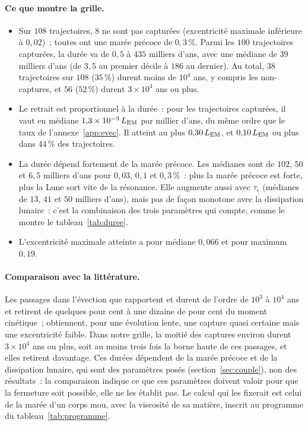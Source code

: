 \documentclass[11pt,a4paper]{article}
\newcommand{\LEM}{\ensuremath{L_{\rm EM}}}
\begin{document}
\paragraph{Ce que montre la grille.}
\begin{itemize}
\item Sur $108$ trajectoires, $8$ ne sont pas capturées (excentricité maximale inférieure à $0{,}02$)~; toutes ont une marée précoce de $0{,}3\,\%$. Parmi les $100$ trajectoires capturées, la durée va de $0{,}5$ à $435$ milliers d'ans, avec une médiane de $39$ milliers d'ans (de $3{,}5$ au premier décile à $186$ au dernier). Au total, $38$ trajectoires sur $108$ ($35\,\%$) durent moins de $10^4$ ans, y compris les non-captures, et $56$ ($52\,\%$) durent $3\times10^4$ ans ou plus.
\item Le retrait est proportionnel à la durée~: pour les trajectoires capturées, il vaut en médiane $1{,}3\times10^{-3}\,\LEM$ par millier d'ans, du même ordre que le taux de l'annexe~\ref{app:evec}. Il atteint au plus $0{,}30\,\LEM$, et $0{,}10\,\LEM$ ou plus dans $44\,\%$ des trajectoires.
\item La durée dépend fortement de la marée précoce. Les médianes sont de $102$, $50$ et $6{,}5$ milliers d'ans pour $0{,}03$, $0{,}1$ et $0{,}3\,\%$~: plus la marée précoce est forte, plus la Lune sort vite de la résonance. Elle augmente aussi avec $\tau_c$ (médianes de $13$, $41$ et $50$ milliers d'ans), mais pas de façon monotone avec la dissipation lunaire~: c'est la combinaison des trois paramètres qui compte, comme le montre le tableau~\ref{tab:duree}.
\item L'excentricité maximale atteinte a pour médiane $0{,}066$ et pour maximum $0{,}19$.
\end{itemize}

\paragraph{Comparaison avec la littérature.}
Les passages dans l'évection que rapportent \citet{WardCanupRufu2020} et \citet{RufuCanup2020} durent de l'ordre de $10^3$ à $10^4$ ans et retirent de quelques pour cent à une dizaine de pour cent du moment cinétique~; \citet{Zahnle2015} obtiennent, pour une évolution lente, une capture quasi certaine mais une excentricité faible. Dans notre grille, la moitié des captures environ durent $3\times10^4$ ans ou plus, soit au moins trois fois la borne haute de ces passages, et elles retirent davantage. Ces durées dépendent de la marée précoce et de la dissipation lunaire, qui sont des paramètres posés (section~\ref{sec:couple}), non des résultats~: la comparaison indique ce que ces paramètres doivent valoir pour que la fermeture soit possible, elle ne les établit pas. Le calcul qui les fixerait est celui de la marée d'un corps mou, avec la viscosité de sa matière, inscrit au programme du tableau~\ref{tab:programme}.
\end{document}
